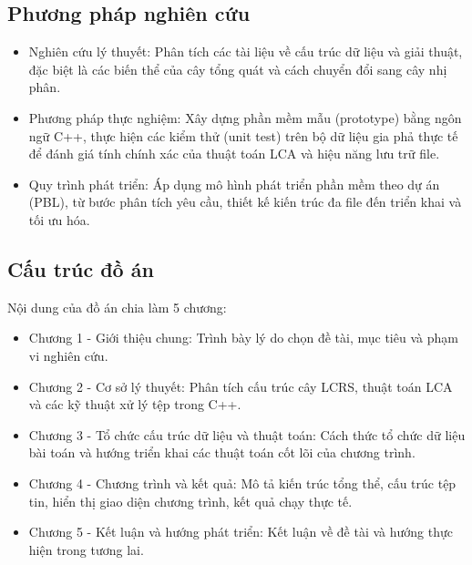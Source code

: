 \subsection{Phương pháp nghiên cứu}
\begin{itemize}
	\item Nghiên cứu lý thuyết: Phân tích các tài liệu về cấu trúc dữ liệu và giải thuật, đặc biệt là các biến thể của cây tổng quát và cách chuyển đổi sang cây nhị phân.
	\item Phương pháp thực nghiệm: Xây dựng phần mềm mẫu (prototype) bằng ngôn ngữ C++, thực hiện các kiểm thử (unit test) trên bộ dữ liệu gia phả thực tế để đánh giá tính chính xác của thuật toán LCA và hiệu năng lưu trữ file.
	\item Quy trình phát triển: Áp dụng mô hình phát triển phần mềm theo dự án (PBL), từ bước phân tích yêu cầu, thiết kế kiến trúc đa file đến triển khai và tối ưu hóa.
\end{itemize}

\subsection{Cấu trúc đồ án}
Nội dung của đồ án chia làm 5 chương:
\begin{itemize}
	\item Chương 1 - Giới thiệu chung: Trình bày lý do chọn đề tài, mục tiêu và phạm vi nghiên cứu.
	\item Chương 2 - Cơ sở lý thuyết: Phân tích cấu trúc cây LCRS, thuật toán LCA và các kỹ thuật xử lý tệp trong C++.
	\item Chương 3 - Tổ chức cấu trúc dữ liệu và thuật toán: Cách thức tổ chức dữ liệu bài toán và hướng triển khai các thuật toán cốt lõi của chương trình.
	\item Chương 4 - Chương trình và kết quả: Mô tả kiến trúc tổng thể, cấu trúc tệp tin, hiển thị giao diện chương trình, kết quả chạy thực tế.
	\item Chương 5 - Kết luận và hướng phát triển: Kết luận về đề tài và hướng thực hiện trong tương lai.
\end{itemize}